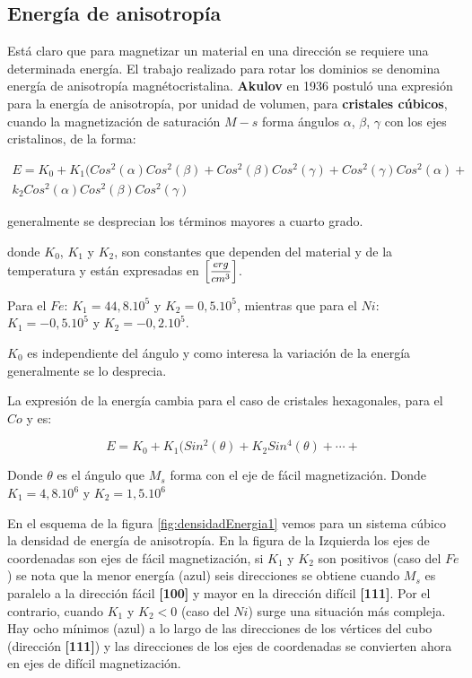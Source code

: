 \subsection{Energía de anisotropía}

Está claro que para magnetizar un material en una dirección se requiere una determinada energía. El trabajo realizado para rotar los dominios se denomina energía de anisotropía magnétocristalina.
\textbf{Akulov} en 1936 postuló una expresión para la energía de anisotropía, por unidad de volumen, para \textbf{cristales cúbicos}, cuando la magnetización de saturación $M-{s}$ forma ángulos $\alpha$, $\beta$, $\gamma$  con los ejes cristalinos, de la forma:


\begin{multline}
E=K_{0}+K_{1}(Cos^{2}(\alpha)Cos^{2}(\beta)+Cos^{2}(\beta)Cos^{2}(\gamma)+Cos^{2}(\gamma)Cos^{2}(\alpha)+ \\
k_{2}Cos^{2}(\alpha)Cos^{2}(\beta)Cos^{2}(\gamma)
\end{multline}

generalmente se desprecian los términos mayores a cuarto grado.

donde $K_{0}$, $K_{1}$ y $K_{2}$, son constantes que dependen del material y de la temperatura y están expresadas en ${\left[ \mfrac{erg}{cm^{3}}\right] }$. 

Para el $Fe$: ${K_{1}=44,8.10^{5}}$ y ${K_{2}=0,5.10^{5}}$, mientras que para el $Ni$: ${K_{1}=-0,5.10^{5}}$ y ${K_{2}=-0,2.10^{5}}$. 

$K_{0}$ es independiente del ángulo y como interesa la variación de la energía generalmente se lo desprecia.

La expresión de la energía cambia para el caso de cristales hexagonales, para el $Co$ y es:

\begin{equation}
E=K_{0}+K_{1}(Sin^{2}(\theta)+K_{2}Sin^{4}(\theta)+\cdots+
\end{equation}

Donde $\theta$ es el ángulo que $M_{s}$ forma con el eje de fácil magnetización. Donde ${K_{1} = 4,8.10^{6}}$ y ${K_{2} = 1,5.10^{6}}$

En el esquema de la figura \ref{fig:densidadEnergia1} vemos para un sistema cúbico la densidad de energía de anisotropía. En la figura de la Izquierda los ejes de coordenadas son ejes de fácil magnetización, si $K_{1}$ y $K_{2}$ son positivos (caso del $Fe$) se nota que la menor energía (azul) seis direcciones se obtiene cuando $M_{s}$ es paralelo a la dirección fácil \textbf{[100]} y mayor en la dirección difícil \textbf{[111]}. Por el contrario, cuando $K_{1}$ y $K_{2} < 0$ (caso  del $Ni$) surge una situación más compleja. Hay ocho mínimos (azul) a lo largo de las direcciones de los vértices del cubo (dirección \textbf{[111]}) y las direcciones de los ejes de coordenadas se convierten ahora en ejes de difícil magnetización.


